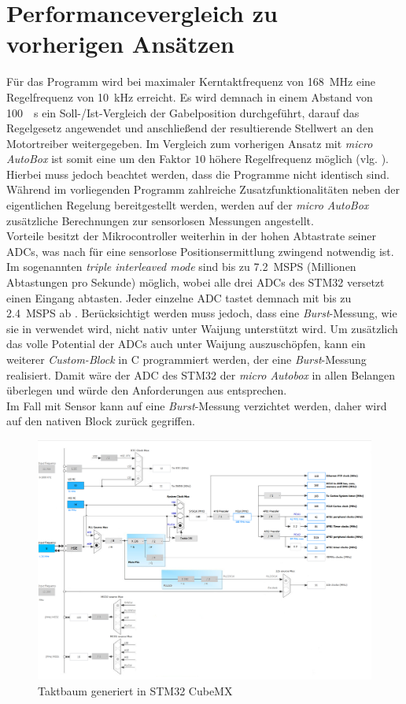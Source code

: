\section{Performancevergleich zu vorherigen Ansätzen} \label{perfVergl}
Für das Programm wird bei maximaler Kerntaktfrequenz von \SI{168}{MHz} eine Regelfrequenz von \SI{10}{kHz} erreicht. Es wird demnach in einem Abstand von \SI{100}{\mu s} ein Soll-/Ist-Vergleich der Gabelposition durchgeführt, darauf das Regelgesetz angewendet und anschließend der resultierende Stellwert an den Motortreiber weitergegeben. Im Vergleich zum vorherigen Ansatz mit \textit{micro AutoBox} ist somit eine um den Faktor $10$ höhere Regelfrequenz möglich (vlg. \cite{VorgängerADP}). Hierbei muss jedoch beachtet werden, dass die Programme nicht identisch sind. Während im vorliegenden Programm zahlreiche Zusatzfunktionalitäten neben der eigentlichen Regelung bereitgestellt werden, werden auf der \textit{micro AutoBox} zusätzliche Berechnungen zur sensorlosen Messungen angestellt. \\
Vorteile besitzt der Mikrocontroller weiterhin in der hohen Abtastrate seiner ADCs, was nach \cite{VorgängerADP} für eine sensorlose Positionsermittlung zwingend notwendig ist. Im sogenannten \textit{triple interleaved mode} sind bis zu \SI{7,2}{MSPS} (Millionen Abtastungen pro Sekunde) möglich, wobei alle drei ADCs des STM32 versetzt einen Eingang abtasten. Jeder einzelne ADC tastet demnach mit bis zu \SI{2,4}{MSPS} ab \cite{stm32}. Berücksichtigt werden muss jedoch, dass eine \textit{Burst}-Messung, wie sie in \cite{VorgängerADP} verwendet wird, nicht nativ unter Waijung  unterstützt wird. Um zusätzlich das volle Potential der ADCs auch unter Waijung auszuschöpfen, kann ein weiterer \textit{Custom-Block} in C programmiert werden, der eine \textit{Burst}-Messung realisiert. Damit wäre der ADC des STM32 der \textit{micro Autobox} in allen Belangen überlegen und würde den Anforderungen aus \cite{VorgängerADP} entsprechen.  \\
Im Fall mit Sensor kann auf eine \textit{Burst}-Messung verzichtet werden, daher wird auf den nativen Block zurück gegriffen.   

\begin{figure}%
\includegraphics[width=\columnwidth]{./Bilder/fig_clock}%
\caption{Taktbaum generiert in STM32 CubeMX}%
\label{fig_clock}%
\end{figure}

